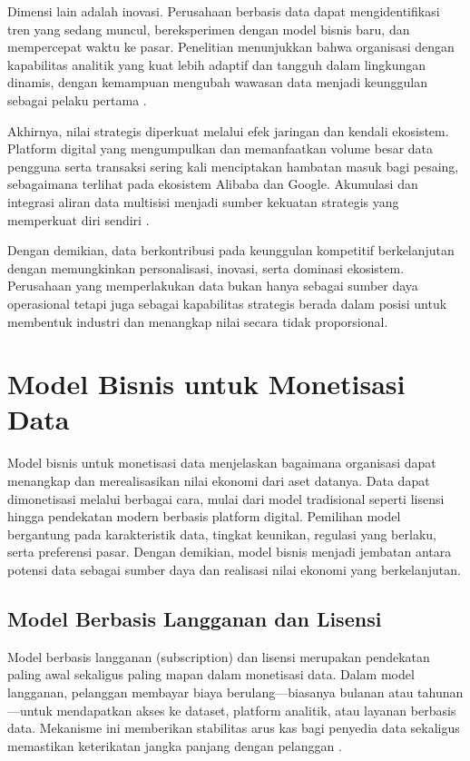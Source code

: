 Dimensi lain adalah inovasi. Perusahaan berbasis data dapat mengidentifikasi tren yang sedang muncul, bereksperimen dengan model bisnis baru, dan mempercepat waktu ke pasar. Penelitian menunjukkan bahwa organisasi dengan kapabilitas analitik yang kuat lebih adaptif dan tangguh dalam lingkungan dinamis, dengan kemampuan mengubah wawasan data menjadi keunggulan sebagai pelaku pertama \cite{bhimani2017management, mckinsey2018analytics}.

Akhirnya, nilai strategis diperkuat melalui efek jaringan dan kendali ekosistem. Platform digital yang mengumpulkan dan memanfaatkan volume besar data pengguna serta transaksi sering kali menciptakan hambatan masuk bagi pesaing, sebagaimana terlihat pada ekosistem Alibaba dan Google. Akumulasi dan integrasi aliran data multisisi menjadi sumber kekuatan strategis yang memperkuat diri sendiri \cite{eisenmann2011platform}.

Dengan demikian, data berkontribusi pada keunggulan kompetitif berkelanjutan dengan memungkinkan personalisasi, inovasi, serta dominasi ekosistem. Perusahaan yang memperlakukan data bukan hanya sebagai sumber daya operasional tetapi juga sebagai kapabilitas strategis berada dalam posisi untuk membentuk industri dan menangkap nilai secara tidak proporsional.


\section{Model Bisnis untuk Monetisasi Data}

Model bisnis untuk monetisasi data menjelaskan bagaimana organisasi dapat menangkap dan merealisasikan nilai ekonomi dari aset datanya. Data dapat dimonetisasi melalui berbagai cara, mulai dari model tradisional seperti lisensi hingga pendekatan modern berbasis platform digital. Pemilihan model bergantung pada karakteristik data, tingkat keunikan, regulasi yang berlaku, serta preferensi pasar. Dengan demikian, model bisnis menjadi jembatan antara potensi data sebagai sumber daya dan realisasi nilai ekonomi yang berkelanjutan.

\subsection{Model Berbasis Langganan dan Lisensi}

Model berbasis langganan (subscription) dan lisensi merupakan pendekatan paling awal sekaligus paling mapan dalam monetisasi data. Dalam model langganan, pelanggan membayar biaya berulang—biasanya bulanan atau tahunan—untuk mendapatkan akses ke dataset, platform analitik, atau layanan berbasis data. Mekanisme ini memberikan stabilitas arus kas bagi penyedia data sekaligus memastikan keterikatan jangka panjang dengan pelanggan \cite{chen2010subscription}. 

